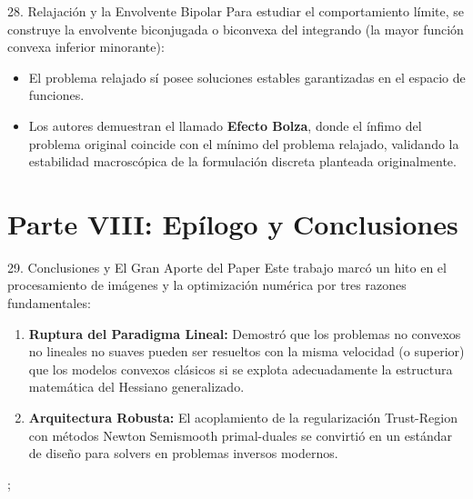 \documentclass[aspectratio=169,11pt]{beamer}
\begin{document}
\begin{frame}{28. Relajación y la Envolvente Bipolar}
    Para estudiar el comportamiento límite, se construye la envolvente biconjugada o biconvexa del integrando (la mayor función convexa inferior minorante):
    \begin{itemize}
        \item El problema relajado sí posee soluciones estables garantizadas en el espacio de funciones.
        \item Los autores demuestran el llamado \textbf{Efecto Bolza}, donde el ínfimo del problema original coincide con el mínimo del problema relajado, validando la estabilidad macroscópica de la formulación discreta planteada originalmente.
    \end{itemize}
\end{frame}

\section{Parte VIII: Epílogo y Conclusiones}

\begin{frame}{29. Conclusiones y El Gran Aporte del Paper}
    Este trabajo marcó un hito en el procesamiento de imágenes y la optimización numérica por tres razones fundamentales:
    \begin{enumerate}
        \item \textbf{Ruptura del Paradigma Lineal:} Demostró que los problemas no convexos no lineales no suaves pueden ser resueltos con la misma velocidad (o superior) que los modelos convexos clásicos si se explota adecuadamente la estructura matemática del Hessiano generalizado.
        \item \textbf{Arquitectura Robusta:} El acoplamiento de la regularización Trust-Region con métodos Newton Semismooth primal-duales se convirtió en un estándar de diseño para solvers en problemas inversos modernos.
    \end{enumerate}
\end{frame}

\begin{frame}[plain]
    \centering
    ;
\end{frame}
\end{document}

